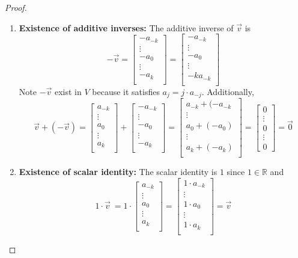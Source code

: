 \documentclass[11pt]{article}
\newcommand{\vect}[1]{\begin{bmatrix}#1\end{bmatrix}}
\newcommand{\R}{\mathbb{R}}
\begin{document}
\begin{enumerate}[label=\arabic*.]
\begin{proof}
\begin{enumerate}
        \item \textbf{Existence of additive inverses:} The additive inverse of $\vec{v}$ is 
        $$-\vec{v} = \vect{-a_{-k} \\ \vdots \\-a_0 \\ \vdots \\ -a_k \\} = \vect{-a_{-k} \\ \vdots \\-a_0 \\ \vdots \\ -k a_{-k} \\}$$
        Note $-\vec{v}$ exist in $V$ because it satisfies $a_j=j\cdot a_{-j}$. Additionally, 
        $$\vec{v} + (-\vec{v}) 
        = \vect{a_{-k} \\ \vdots \\a_0 \\ \vdots \\ a_{k} \\} + \vect{-a_{-k} \\ \vdots \\-a_0 \\ \vdots \\ -a_{k} \\} 
        = \vect{a_{-k}+ (-a_{-k} \\ \vdots \\a_0+(-a_0) \\ \vdots \\ a_{k} + (-a_k) \\} 
        = \vect{0 \\ \vdots \\ 0 \\ \vdots \\ 0}
        = \vec{0}
        $$ 
        \item \textbf{Existence of scalar identity:} The scalar identity is $1$ since $1\in\R$ and 
        \[
        1\cdot \vec{v}\ = 1\cdot \vect{a_{-k} \\ \vdots \\a_0 \\ \vdots \\ a_k \\} 
        = \vect{1 \cdot a_{-k} \\ \vdots \\ 1 \cdot a_0 \\ \vdots \\ 1 \cdot a_k \\} = \vec{v}
        \]
        

\end{enumerate}
\end{proof}
\end{enumerate}
\end{document}
